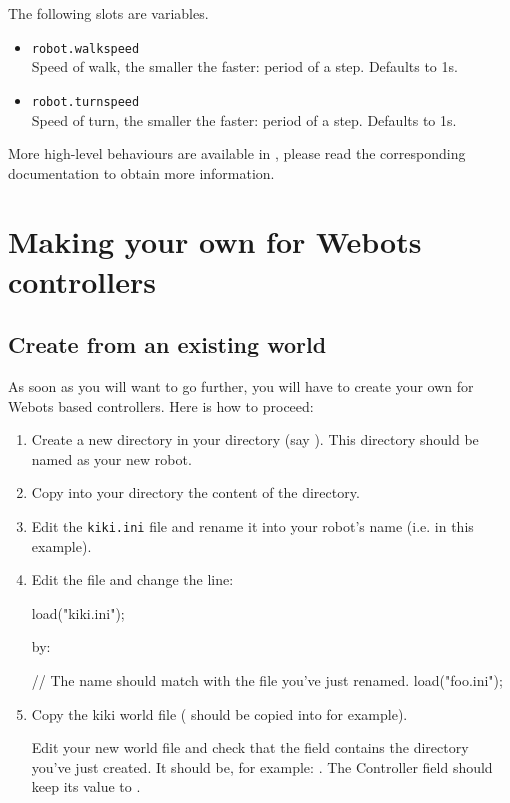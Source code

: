 The following slots are variables.
\begin{itemize}
\item \lstinline|robot.walkspeed|\\
  Speed of walk, the smaller the faster: period of a step. Defaults to
  1s.
\item \lstinline|robot.turnspeed|\\
  Speed of turn, the smaller the faster: period of a step. Defaults to
  1s.
\end{itemize}

More high-level behaviours are available in , please read
the corresponding documentation to obtain more information.


\section{Making your own \urbi for Webots controllers}
\label{webots.own}%

\subsection{Create from an existing world}
\label{webots.own.create}%

As soon as you will want to go further, you will have to create your
own \urbi for Webots based controllers. Here is how to proceed:

\begin{enumerate}

\item Create a new directory in your  directory (say
  ). This directory should be named as your new robot.

\item Copy into your  directory the content of the
   directory.

\item Edit the \nolinkurl{kiki.ini} file and rename it into your
  robot's name (i.e.  in this example).

\item Edit the  file and change the line:

\begin{urbifixme}
load("kiki.ini");
\end{urbifixme}

by:

\begin{urbifixme}
// The name should match with the file you've just renamed.
load("foo.ini");
\end{urbifixme}

\item Copy the kiki world file ( should be
  copied into  for example).

  Edit your new world file and check that the field
   contains the directory you've just created. It
  should be, for example: .  The Controller field should
  keep its value to .
\end{enumerate}


